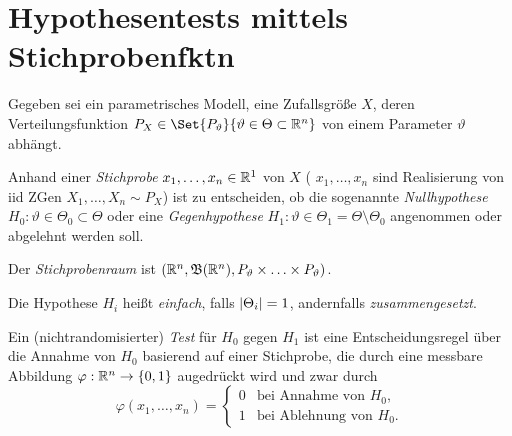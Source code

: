 \documentclass{cheat-sheet}
\newcommand{\Bor}{\mathfrak{B}} %
\begin{document}
\raggedcolumns %



\section{Hypothesentests mittels Stichprobenfktn}



\begin{modell}
  Gegeben sei ein parametrisches Modell, \dh eine Zufallsgröße $X$, deren Verteilungsfunktion $P_X \in \Set{P_\vartheta}{\vartheta \in \Theta \subset \R^n}$ von einem Parameter $\vartheta$ abhängt.
\end{modell}

\begin{prob}
  Anhand einer \emph{Stichprobe} $x_1, \ldots, x_n \in \mathbb{R}^1$ von $X$ (\dh{} $x_1, \ldots, x_n$ sind Realisierung von iid ZGen $X_1, \ldots, X_n \sim P_X$) ist zu entscheiden, ob die sogenannte \emph{Nullhypothese} $H_0 : \vartheta \in \Theta_0 \subset \Theta$ oder eine \emph{Gegenhypothese} $H_1 : \vartheta \in \Theta_1 = \Theta \setminus \Theta_0$ angenommen oder abgelehnt werden soll.
\end{prob}

\begin{defn}
  Der \emph{Stichprobenraum} ist $(\R^n, \Bor(\R^n), P_\vartheta \times \ldots \times P_\vartheta)$.
\end{defn}

\begin{terminologie}
  Die Hypothese $H_i$ heißt \emph{einfach}, falls $\lvert\Theta_i\rvert = 1$, andernfalls \emph{zusammengesetzt}.
\end{terminologie}

\begin{defn}
  Ein (nichtrandomisierter) \emph{Test} für $H_0$ gegen $H_1$ ist eine Entscheidungsregel über die Annahme von $H_0$ basierend auf einer Stichprobe, die durch eine messbare Abbildung $\varphi : \mathbb{R}^n \to \{ 0, 1 \}$ augedrückt wird und zwar durch
  \[ \varphi(x_1, \ldots, x_n) = \begin{cases}
    0 & \text{bei Annahme von $H_0$,} \\
    1 & \text{bei Ablehnung von $H_0$.}
  \end{cases} \]
\end{defn}
\end{document}
